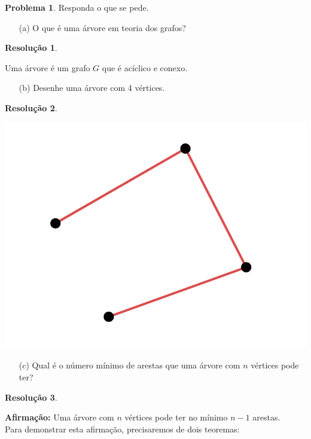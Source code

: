 \documentclass[12pt, a4paper]{article}
\theoremstyle{definition} \newtheorem{prob}{Problema}
\newtheorem*{res}{Resolução}
\begin{document}
\begin{prob} %
Responda o que se pede.
\begin{enumerate}
\item[(a)] O que é uma árvore em teoria dos grafos?
\end{enumerate}
\dotfill
\begin{res}
\end{res}
Uma árvore é um grafo \(G\) que é acíclico e conexo.

\dotfill
\begin{enumerate}
\item[(b)] Desenhe uma árvore com 4 vértices.
\end{enumerate}
\dotfill
\begin{res}
\end{res}
\begin{center}
\includegraphics[scale=0.25]{arvore_4vertices.png}
\end{center}

\dotfill
\begin{enumerate}
\item[(c)] Qual é o número mínimo de arestas que uma árvore com \(n\) vértices pode ter?
\end{enumerate}
\dotfill
\begin{res}
\end{res}
\textbf{Afirmação:} Uma árvore com \(n\) vértices pode ter no mínimo \(n-1\) arestas. \\

Para demonstrar esta afirmação, precisaremos de dois teoremas: \\


\end{prob}
\end{document}
